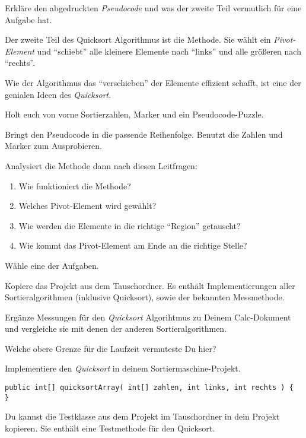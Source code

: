 \documentclass[10pt, a5paper, landscape, ngerman]{arbeitsblatt}
\begin{document}
\begin{aufgabe}
 Erkläre den abgedruckten \emph{Pseudocode} und was der zweite Teil  vermutlich für eine Aufgabe hat.
\end{aufgabe}

\clearpage
\TITEL[Quicksort 3]

Der zweite Teil des Quicksort Algorithmus ist die  Methode. Sie wählt ein \emph{Pivot-Element} und \enquote{schiebt} alle kleinere Elemente nach \enquote{links} und alle größeren nach \enquote{rechts}.

Wie der Algorithmus das \enquote{verschieben} der Elemente effizient schafft, ist eine der genialen Ideen des \emph{Quicksort}.

\begin{aufgabe}
	Holt euch von vorne Sortierzahlen, Marker und ein Pseudocode-Puzzle.

	Bringt den Pseudocode in die passende Reihenfolge. Benutzt die Zahlen und Marker zum Ausprobieren.

	Analysiert die Methode dann nach diesen Leitfragen:
	\begin{enumerate}
		\item Wie funktioniert die  Methode?
		\item Welches Pivot-Element wird gewählt?
		\item Wie werden die Elemente in die richtige \enquote{Region} getauscht?
		\item Wie kommt das Pivot-Element am Ende an die richtige Stelle?
	\end{enumerate}
\end{aufgabe}

\clearpage
\TITEL[Quicksort 4]

Wähle eine der Aufgaben.

\begin{aufgabe}[subtitle=Laufzeitmessung]
	Kopiere das Projekt  aus dem Tauschordner. Es enthält Implementierungen aller Sortieralgorithmen (inklusive Quicksort), sowie der bekannten Messmethode.

	Ergänze Messungen für den \emph{Quicksort} Algorihtmus zu Deinem Calc-Dokument und vergleiche sie mit denen der anderen Sortieralgorithmen.

	Welche obere Grenze für die Laufzeit vermuteste Du hier?
\end{aufgabe}

\begin{aufgabe}[subtitle=Implementierung für gute Programmierer]
	Implementiere den \emph{Quicksort} in deinem Sortiermaschine-Projekt.
	\begin{verbatim}
public int[] quicksortArray( int[] zahlen, int links, int rechts ) {
}
	\end{verbatim}

	 Du kannst die Testklasse aus dem Projekt  im Tauschordner in dein Projekt kopieren. Sie enthält eine Testmethode für den Quicksort.
\end{aufgabe}
\end{document}
